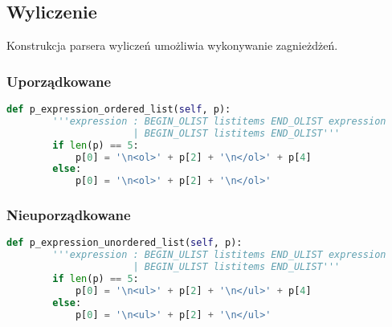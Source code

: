 \subsection{Wyliczenie}

Konstrukcja parsera wyliczeń umożliwia wykonywanie zagnieżdżeń.

\subsubsection{Uporządkowane}

\begin{lstlisting}[language={Python}, caption={Wyliczenie uporządkowane}, label={gramatyka-tekst} ]
    def p_expression_ordered_list(self, p):
        '''expression : BEGIN_OLIST listitems END_OLIST expression
                      | BEGIN_OLIST listitems END_OLIST'''
        if len(p) == 5:
            p[0] = '\n<ol>' + p[2] + '\n</ol>' + p[4]
        else:
            p[0] = '\n<ol>' + p[2] + '\n</ol>'
\end{lstlisting}

\subsubsection{Nieuporządkowane}

\begin{lstlisting}[language={Python}, caption={Wyliczenie nieuporządkowane}, label={gramatyka-tekst} ]
    def p_expression_unordered_list(self, p):
        '''expression : BEGIN_ULIST listitems END_ULIST expression
                      | BEGIN_ULIST listitems END_ULIST'''
        if len(p) == 5:
            p[0] = '\n<ul>' + p[2] + '\n</ul>' + p[4]
        else:
            p[0] = '\n<ul>' + p[2] + '\n</ul>'
\end{lstlisting}